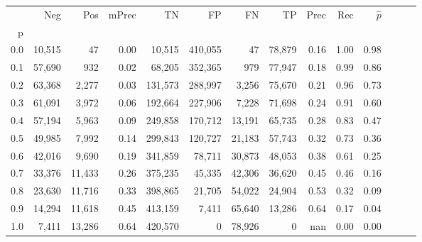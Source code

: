 \begin{tabular}{rrrrrrrrrrrrrr}
\toprule
{} &     Neg &     Pos & mPrec &       TN &       FP &      FN &      TP &  Prec &   Rec & $\hat{p}$ \\
p   &         &         &       &          &          &         &         &       &       &           \\
\midrule
0.0 &  10,515 &      47 &  0.00 &   10,515 &  410,055 &      47 &  78,879 &  0.16 &  1.00 &      0.98 \\
0.1 &  57,690 &     932 &  0.02 &   68,205 &  352,365 &     979 &  77,947 &  0.18 &  0.99 &      0.86 \\
0.2 &  63,368 &   2,277 &  0.03 &  131,573 &  288,997 &   3,256 &  75,670 &  0.21 &  0.96 &      0.73 \\
0.3 &  61,091 &   3,972 &  0.06 &  192,664 &  227,906 &   7,228 &  71,698 &  0.24 &  0.91 &      0.60 \\
0.4 &  57,194 &   5,963 &  0.09 &  249,858 &  170,712 &  13,191 &  65,735 &  0.28 &  0.83 &      0.47 \\
0.5 &  49,985 &   7,992 &  0.14 &  299,843 &  120,727 &  21,183 &  57,743 &  0.32 &  0.73 &      0.36 \\
0.6 &  42,016 &   9,690 &  0.19 &  341,859 &   78,711 &  30,873 &  48,053 &  0.38 &  0.61 &      0.25 \\
0.7 &  33,376 &  11,433 &  0.26 &  375,235 &   45,335 &  42,306 &  36,620 &  0.45 &  0.46 &      0.16 \\
0.8 &  23,630 &  11,716 &  0.33 &  398,865 &   21,705 &  54,022 &  24,904 &  0.53 &  0.32 &      0.09 \\
0.9 &  14,294 &  11,618 &  0.45 &  413,159 &    7,411 &  65,640 &  13,286 &  0.64 &  0.17 &      0.04 \\
1.0 &   7,411 &  13,286 &  0.64 &  420,570 &        0 &  78,926 &       0 &   nan &  0.00 &      0.00 \\
\bottomrule
\end{tabular}
